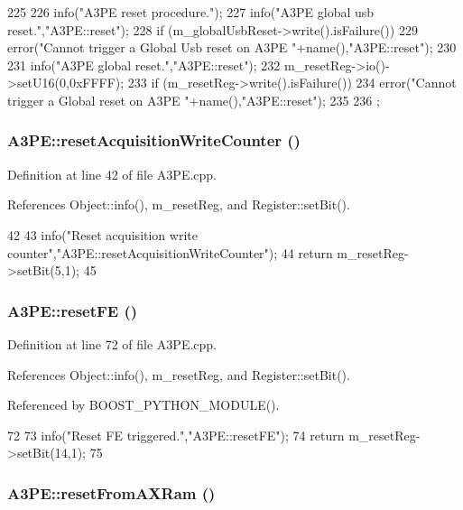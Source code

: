 \begin{DoxyCode}
225                {
226         info("A3PE reset procedure.");
227     info("A3PE global usb reset.","A3PE::reset");
228     if (m_globalUsbReset->write().isFailure()){
229       error("Cannot trigger a Global Usb reset on A3PE "+name(),"A3PE::reset");
230     }
231     info("A3PE global reset.","A3PE::reset");
232         m_resetReg->io()->setU16(0,0xFFFF);
233     if (m_resetReg->write().isFailure()){
234       error("Cannot trigger a Global reset on A3PE "+name(),"A3PE::reset");
235     }
236   };
\end{DoxyCode}
\hypertarget{classA3PE_a557ea9cfa97a03db1514af2fe8936df3}{
\subsubsection[{resetAcquisitionWriteCounter}]{ A3PE::resetAcquisitionWriteCounter ()}}
\label{classA3PE_a557ea9cfa97a03db1514af2fe8936df3}


Definition at line 42 of file A3PE.cpp.

References Object::info(), m\_\-resetReg, and Register::setBit().


\begin{DoxyCode}
42                                              {
43   info("Reset acquisition write counter","A3PE::resetAcquisitionWriteCounter");
44   return m_resetReg->setBit(5,1);
45 }
\end{DoxyCode}
\hypertarget{classA3PE_a2cfdb2f37d3d786cbe1ff42fef37b276}{
\subsubsection[{resetFE}]{ A3PE::resetFE ()}}
\label{classA3PE_a2cfdb2f37d3d786cbe1ff42fef37b276}


Definition at line 72 of file A3PE.cpp.

References Object::info(), m\_\-resetReg, and Register::setBit().

Referenced by BOOST\_\-PYTHON\_\-MODULE().


\begin{DoxyCode}
72                         {
73   info("Reset FE triggered.","A3PE::resetFE");
74   return m_resetReg->setBit(14,1);
75 }
\end{DoxyCode}
\hypertarget{classA3PE_aa10639563d06c0d09f3c0725710ff35d}{
\subsubsection[{resetFromAXRam}]{ A3PE::resetFromAXRam ()}}
\label{classA3PE_aa10639563d06c0d09f3c0725710ff35d}


